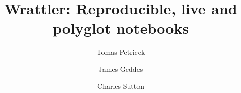 \documentclass[sigplan]{acmart}\settopmatter{printfolios=true,printccs=false,printacmref=false}
\begin{document}
\title{Wrattler: \textnormal{Reproducible, live and polyglot notebooks}}

\author{Tomas Petricek}
\author{James Geddes}
\author{Charles Sutton}

\newcommand{\vect}[1]{\langl #1 \rangl}
\newcommand{\langl}{\begin{picture}(4.5,7)
\put(1.1,2.5){\rotatebox{60}{\line(1,0){5.5}}}
\put(1.1,2.5){\rotatebox{300}{\line(1,0){5.5}}}
\end{picture}}
\newcommand{\rangl}{\begin{picture}(4.5,7)
\put(.9,2.5){\rotatebox{120}{\line(1,0){5.5}}}
\put(.9,2.5){\rotatebox{240}{\line(1,0){5.5}}}
\end{picture}}
\newcommand{\ball}[1]{\FPeval{\result}{clip(201+#1)}\textnormal{\ding{\result}}}
\newcommand{\lsep}{~\,|\,~}
\newcommand{\num}[1]{\textcolor{numclr}{#1}}
\newcommand{\str}[1]{\textnormal{\textcolor{strclr}{\sffamily "#1"}}}
\newcommand{\strf}[1]{\textnormal{\textcolor{strclr}{\sffamily #1}}}
\newcommand{\rstr}[1]{\textnormal{\textcolor{rstrclr}{\sffamily "#1"}}}
\newcommand{\ident}[1]{\textnormal{\sffamily #1}}
\newcommand{\qident}[1]{\textnormal{\sffamily \textquotesingle #1\textquotesingle}}
\newcommand{\dom}{\ident{dom}}
\newcommand{\kvd}[1]{\textnormal{\textcolor{kvdclr}{\sffamily #1}}}

\newcommand{\bndclr}[1]{\textcolor{kvdclr}{#1}}
\newcommand{\bkndclr}[1]{\textcolor{prepclr}{#1}}
\newcommand{\blblclr}[1]{\textcolor{numclr}{#1}}
\newcommand{\bnd}[1]{\textnormal{\textcolor{kvdclr}{\sffamily #1}}}
\newcommand{\bknd}[1]{\textnormal{\textcolor{prepclr}{\sffamily #1}}}
\newcommand{\blbl}[1]{\textnormal{\textcolor{numclr}{\sffamily #1}}}
\end{document}
